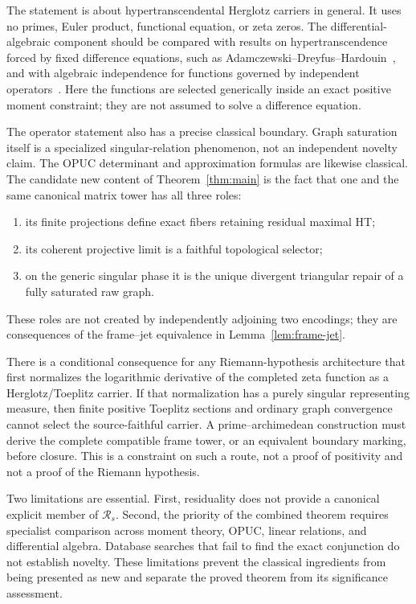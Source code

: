 \documentclass[11pt]{article}
\newcommand{\cR}{\mathcal R}
\begin{document}
The statement is about hypertranscendental Herglotz carriers in general.  It uses no primes,
Euler product, functional equation, or zeta zeros.  The differential-algebraic component should be
compared with results on hypertranscendence forced by fixed difference equations, such as
Adamczewski--Dreyfus--Hardouin~\cite{ADH2021}, and with algebraic independence for functions
governed by independent operators~\cite{ADHW2024}.  Here the functions are selected generically
inside an exact positive moment constraint; they are not assumed to solve a difference equation.

The operator statement also has a precise classical boundary.  Graph saturation itself is a
specialized singular-relation phenomenon, not an independent novelty claim.  The OPUC determinant
and approximation formulas are likewise classical.  The candidate new content of
Theorem~\ref{thm:main} is the fact that one and the same canonical matrix tower has all three
roles:
\begin{enumerate}[leftmargin=*]
  \item its finite projections define exact fibers retaining residual maximal HT;
  \item its coherent projective limit is a faithful topological selector;
  \item on the generic singular phase it is the unique divergent triangular repair of a fully
  saturated raw graph.
\end{enumerate}
These roles are not created by independently adjoining two encodings; they are consequences of
the frame--jet equivalence in Lemma~\ref{lem:frame-jet}.

There is a conditional consequence for any Riemann-hypothesis architecture that first normalizes
the logarithmic derivative of the completed zeta function as a Herglotz/Toeplitz carrier.  If that
normalization has a purely singular representing measure, then finite positive Toeplitz sections
and ordinary graph convergence cannot select the source-faithful carrier.  A prime--archimedean
construction must derive the complete compatible frame tower, or an equivalent boundary marking,
before closure.  This is a constraint on such a route, not a proof of positivity and not a proof of
the Riemann hypothesis.

Two limitations are essential.  First, residuality does not provide a canonical explicit member
of $\cR_s$.  Second, the priority of the combined theorem requires specialist comparison across
moment theory, OPUC, linear relations, and differential algebra.  Database searches that fail to
find the exact conjunction do not establish novelty.  These limitations prevent the classical
ingredients from being presented as new and separate the proved theorem from its significance
assessment.
\end{document}
